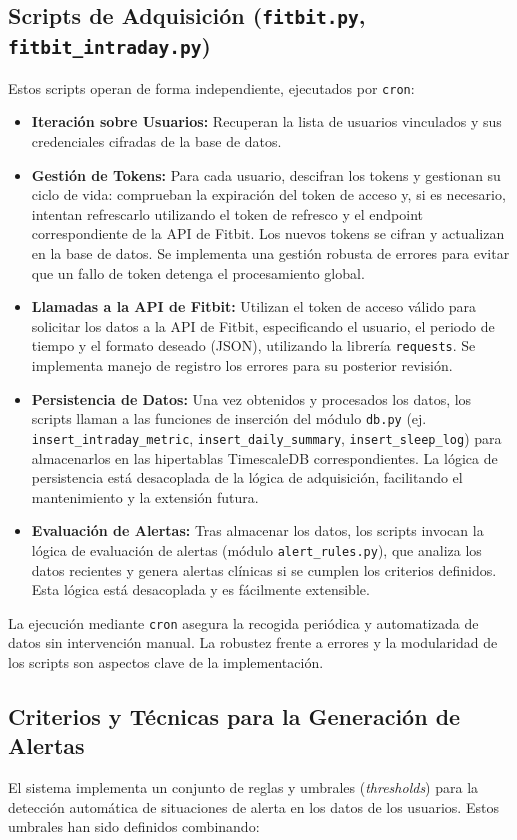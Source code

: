 \subsection{Scripts de Adquisición (\texttt{fitbit.py}, \texttt{fitbit\_intraday.py})}
Estos scripts operan de forma independiente, ejecutados por \texttt{cron}:
\begin{itemize}
    \item \textbf{Iteración sobre Usuarios:} Recuperan la lista de usuarios vinculados y sus credenciales cifradas de la base de datos. 
    \item \textbf{Gestión de Tokens:} Para cada usuario, descifran los tokens y gestionan su ciclo de vida: comprueban la expiración del token de acceso y, si es necesario, intentan refrescarlo utilizando el token de refresco y el endpoint correspondiente de la API de Fitbit. Los nuevos tokens se cifran y actualizan en la base de datos. Se implementa una gestión robusta de errores para evitar que un fallo de token detenga el procesamiento global.
    \item \textbf{Llamadas a la API de Fitbit:} Utilizan el token de acceso válido para solicitar los datos a la API de Fitbit, especificando el usuario, el periodo de tiempo y el formato deseado (JSON), utilizando la librería \texttt{requests}. Se implementa manejo de registro los errores para su posterior revisión.
    \item \textbf{Persistencia de Datos:} Una vez obtenidos y procesados los datos, los scripts llaman a las funciones de inserción del módulo \texttt{db.py} (ej. \texttt{insert\_intraday\_metric}, \texttt{insert\_daily\_summary}, \texttt{insert\_sleep\_log}) para almacenarlos en las hipertablas TimescaleDB correspondientes. La lógica de persistencia está desacoplada de la lógica de adquisición, facilitando el mantenimiento y la extensión futura.
    \item \textbf{Evaluación de Alertas:} Tras almacenar los datos, los scripts invocan la lógica de evaluación de alertas (módulo \texttt{alert\_rules.py}), que analiza los datos recientes y genera alertas clínicas si se cumplen los criterios definidos. Esta lógica está desacoplada y es fácilmente extensible.
\end{itemize}
La ejecución mediante \texttt{cron} asegura la recogida periódica y automatizada de datos sin intervención manual. La robustez frente a errores y la modularidad de los scripts son aspectos clave de la implementación.


\subsection{Criterios y Técnicas para la Generación de Alertas}
El sistema implementa un conjunto de reglas y umbrales (\textit{thresholds}) para la detección automática de situaciones de alerta en los datos de los usuarios. Estos umbrales han sido definidos combinando:

